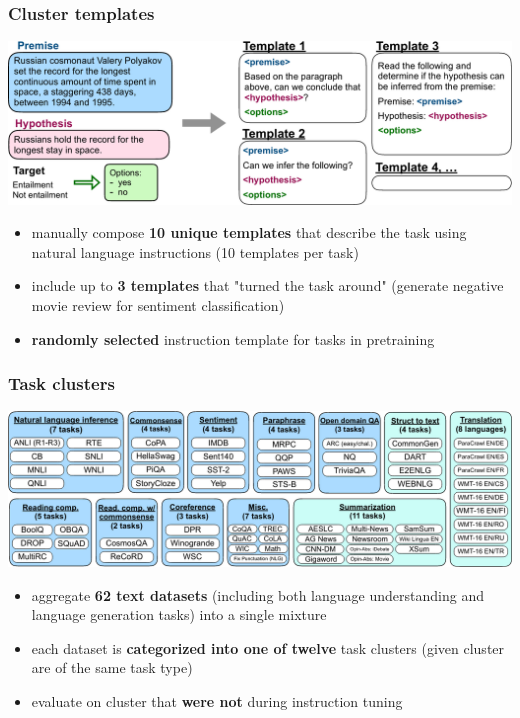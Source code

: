 \documentclass{beamer}
\begin{document}
\begin{frame}
    \frametitle{Cluster templates}
    \begin{center}
        \includegraphics[scale=1.2]{img/templates.png}
    \end{center}
    \begin{itemize}
    \footnotesize
        \item manually compose \textbf{10 unique templates} that describe the task using natural language instructions (10 templates per task)
        \item include up to \textbf{3 templates} that "turned the task around" (generate negative movie review for sentiment classification)
        \item \textbf{randomly selected} instruction template for tasks in pretraining
    \end{itemize}
\end{frame}

\begin{frame}
    \frametitle{Task clusters}
    \begin{center}
        \includegraphics[scale=1.2]{img/task_clusters.png}
    \end{center}
    \begin{itemize}
    \footnotesize
        \item aggregate \textbf{62 text datasets} (including both language understanding and language generation tasks) into a single mixture
        \item each dataset is \textbf{categorized into one of twelve} task clusters (given cluster are of the same task type)
        \item evaluate on cluster that \textbf{were not} during instruction tuning
    \end{itemize}
\end{frame}
\end{document}

